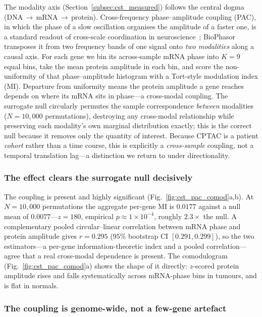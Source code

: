 \documentclass[preprint,12pt,amsmath,amssymb,superscriptaddress,floatfix]{revtex4-2}
\begin{document}
The modality axis (Section~\ref{subsec:cst_measured}) follows the central dogma
(DNA\,$\rightarrow$\,mRNA\,$\rightarrow$\,protein). Cross-frequency
phase--amplitude coupling (PAC), in which the phase of a slow oscillation
organises the amplitude of a faster one, is a standard readout of cross-scale
coordination in neuroscience~\citep{scherer2022}; BioPhasor transposes it from two
frequency bands of one signal onto \emph{two modalities} along a causal axis. For
each gene we bin its across-sample mRNA phase into $K=9$ equal bins, take the mean
protein amplitude in each bin, and score the non-uniformity of that
phase--amplitude histogram with a Tort-style modulation index (MI). Departure from
uniformity means the protein amplitude a gene reaches depends on where its mRNA
sits in phase---a cross-modal coupling. The surrogate null circularly permutes the
sample correspondence \emph{between} modalities ($N=10{,}000$ permutations),
destroying any cross-modal relationship while preserving each modality's own
marginal distribution exactly; this is the correct null because it removes only
the quantity of interest. Because CPTAC is a patient \emph{cohort} rather than a
time course, this is explicitly a \emph{cross-sample} coupling, not a temporal
translation lag---a distinction we return to under directionality.

\subsubsection{The effect clears the surrogate null decisively}

The coupling is present and highly significant
(Fig.~\ref{fig:cst_pac_comod}a,b). At $N=10{,}000$ permutations the aggregate
per-gene MI is $0.0177$ against a null mean of $0.0077$---$z=180$, empirical
$p\approx1\times10^{-4}$, roughly $2.3\times$ the null. A complementary pooled
circular--linear correlation between mRNA phase and protein amplitude gives
$r=0.295$ ($95\%$ bootstrap CI $[0.291,0.299]$), so the two estimators---a
per-gene information-theoretic index and a pooled correlation---agree that a real
cross-modal dependence is present. The comodulogram
(Fig.~\ref{fig:cst_pac_comod}a) shows the shape of it directly: $z$-scored protein
amplitude rises and falls systematically across mRNA-phase bins in tumours, and is
flat in normals.

\subsubsection{The coupling is genome-wide, not a few-gene artefact}
\end{document}

